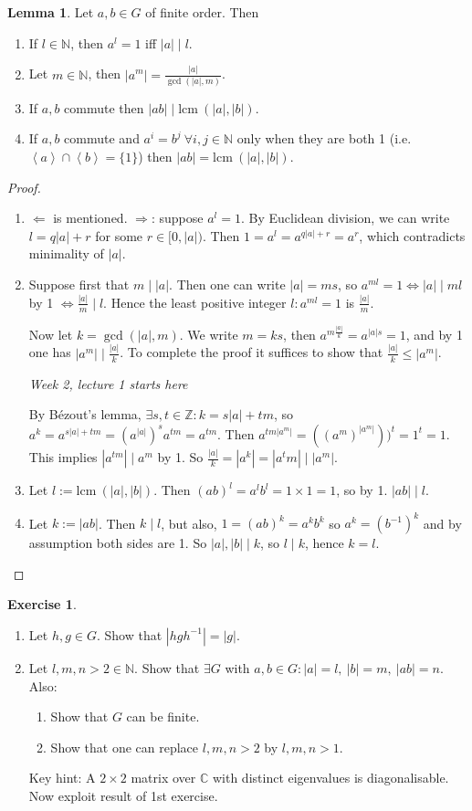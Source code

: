 \documentclass[a4paper]{article}
\newcommand{\la}{\left\langle}
\newcommand{\ra}{\right\rangle}
\newcommand{\Z}{\mathbb{Z}}
\newcommand{\N}{\mathbb{N}}
\newcommand{\lcm}{\text{lcm}\ }
\theoremstyle{definition}
\newtheorem{lemma}[defn]{Lemma}
\newtheorem{exe}[defn]{Exercise}
\begin{document}
\begin{lemma}
\label{lemma:orderlem}
Let $a,b\in G$ of finite order. Then
\begin{enumerate}
\item If $l\in \N$, then $a^l=1$ iff $|a|\mid l$.
\item Let $m\in \N$, then $\displaystyle |a^m|=\frac{|a|}{\gcd (|a|,m)}$.
\item If $a,b$ commute then $|ab|\mid \lcm (|a|,|b|)$.
\item If $a,b$ commute and $a^i=b^j \ \forall i,j\in \N$ only when they are both 1 (i.e. $\la a\ra \cap \la b\ra =\{1\}$) then $|ab|= \lcm (|a|,|b|)$.
\end{enumerate}
\end{lemma}
\begin{proof}
\begin{enumerate}
\item $\Leftarrow$ is mentioned. $\Rightarrow$: suppose $a^l=1$. By Euclidean division, we can write $l=q|a|+r$ for some $r\in[0,|a|)$. Then $1=a^l=a^{q|a|+r}=a^r$, which contradicts minimality of $|a|$.
\item Suppose first that $m\mid |a|$. Then one can write $|a|=ms$, so $a^{ml}=1\Leftrightarrow |a| \mid ml$ by 1 $\displaystyle \Leftrightarrow \frac{|a|}{m}\mid l$. Hence the least positive integer $l:a^{ml}=1$ is $\displaystyle \frac{|a|}{m}$.

Now let $k=\gcd (|a|,m)$. We write $m=ks$, then $a^{m\frac{|a|}{k}}=a^{|a|s}=1$, and by 1 one has $|a^m| \mid \frac{|a|}{k}$. To complete the proof it suffices to show that $\frac{|a|}{k}\leq |a^m|$.
\begin{flushright}
\textit{Week 2, lecture 1 starts here}
\end{flushright}
By Bézout's lemma, $\exists s,t\in\Z:k=s|a|+tm$, so $a^k=a^{s|a|+tm}=(a^{|a|})^s a^{tm}=a^{tm}$. Then $a^{tm|a^m|}=((a^m)^{|a^m|}))^t=1^t=1$. This implies $|a^{tm}|\mid a^m$ by 1. So $\frac{|a|}{k}=|a^k|=|a^tm|\mid |a^m|$.
\item Let $l:=\lcm(|a|,|b|)$. Then $(ab)^l=a^lb^l=1\times 1=1$, so by 1. $|ab|\mid l$.
\item Let $k:=|ab|$. Then $k\mid l$, but also, $1=(ab)^k=a^kb^k$ so $a^k=\left(b^{-1}\right)^k$ and by assumption both sides are 1. So $|a|,|b|\mid k$, so $l\mid k$, hence $k=l$.
\end{enumerate}
\end{proof}
\begin{exe}
\label{exe:conjaugatesordersequal}
\begin{enumerate}
\item Let $h,g\in G$. Show that $\left|hgh^{-1}\right|=|g|$.
\item Let $l,m,n>2\in\N$. Show that $\exists G$ with $a,b\in G:|a|=l,\ |b|=m,\ |ab|=n$. Also:
\begin{enumerate}
\item Show that $G$ can be finite.
\item Show that one can replace $l,m,n>2$ by $l,m,n>1$.
\end{enumerate}
Key hint: A $2\times 2$ matrix over $\mathbb C$ with distinct eigenvalues is diagonalisable. Now exploit result of 1st exercise.
\end{enumerate}
\end{exe}
\end{document}

